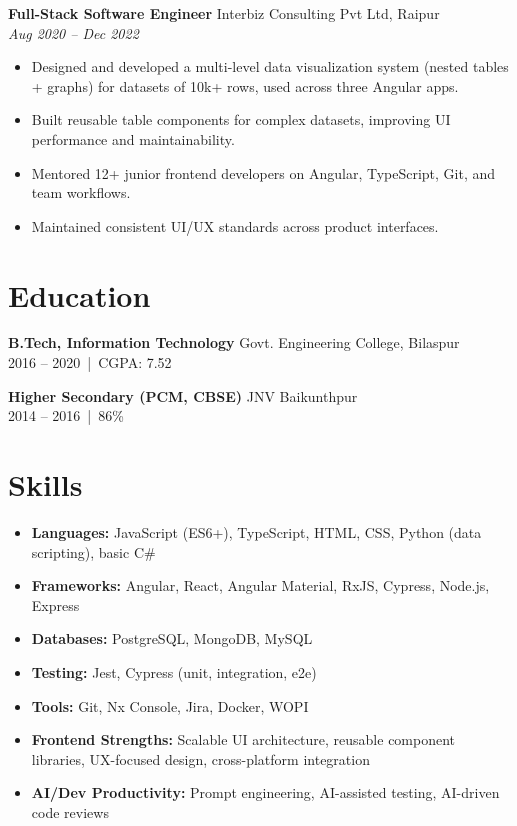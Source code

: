 \documentclass[a4paper,10pt]{article}
\begin{document}
\textbf{Full-Stack Software Engineer} \hfill Interbiz Consulting Pvt Ltd, Raipur \\
\textit{Aug 2020 -- Dec 2022}
\begin{itemize}
    \item Designed and developed a multi-level data visualization system (nested tables + graphs) for datasets of 10k+ rows, used across three Angular apps.
    \item Built reusable table components for complex datasets, improving UI performance and maintainability.
    \item Mentored 12+ junior frontend developers on Angular, TypeScript, Git, and team workflows.
    \item Maintained consistent UI/UX standards across product interfaces.
\end{itemize}

\section*{Education}
\textbf{B.Tech, Information Technology} \hfill Govt. Engineering College, Bilaspur \\
2016 -- 2020 \,|\, CGPA: 7.52

\textbf{Higher Secondary (PCM, CBSE)} \hfill JNV Baikunthpur \\
2014 -- 2016 \,|\, 86\%

\section*{Skills}
\begin{itemize}
    \item \textbf{Languages:} JavaScript (ES6+), TypeScript, HTML, CSS, Python (data scripting), basic C\#
    \item \textbf{Frameworks:} Angular, React, Angular Material, RxJS, Cypress, Node.js, Express
    \item \textbf{Databases:} PostgreSQL, MongoDB, MySQL
    \item \textbf{Testing:} Jest, Cypress (unit, integration, e2e)
    \item \textbf{Tools:} Git, Nx Console, Jira, Docker, WOPI
    \item \textbf{Frontend Strengths:} Scalable UI architecture, reusable component libraries, UX-focused design, cross-platform integration
    \item \textbf{AI/Dev Productivity:} Prompt engineering, AI-assisted testing, AI-driven code reviews
\end{itemize}
\end{document}
